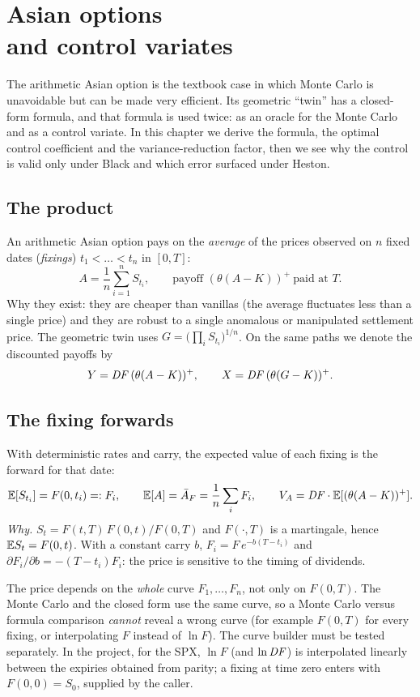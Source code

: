 \chapter[Asian options and control variates]{Asian options\\ and control variates}
\label{cap:asiatiche}

The arithmetic Asian option is the textbook case in which Monte Carlo is unavoidable but can be made very efficient.
Its geometric ``twin'' has a closed-form formula, and that formula is used twice: as an oracle for the Monte Carlo and
as a control variate. In this chapter we derive the formula, the optimal control coefficient and the variance-reduction
factor, then we see why the control is valid only under Black and which error surfaced under Heston.

\section{The product}
An arithmetic Asian option pays on the \emph{average} of the prices observed on $n$ fixed dates (\emph{fixings})
$t_1<\dots<t_n$ in $[0,T]$:
\begin{equation}
A=\frac1n\sum_{i=1}^nS_{t_i},\qquad\text{payoff }(\theta(A-K))^+\ \text{paid at }T .
\end{equation}
Why they exist: they are cheaper than vanillas (the average fluctuates less than a single price) and they are robust
to a single anomalous or manipulated settlement price. The geometric twin uses $G=\big(\prod_iS_{t_i}\big)^{1/n}$. On
the same paths we denote the discounted payoffs by
\[
Y=\mathit{DF}\,(\theta(A-K))^+,\qquad X=\mathit{DF}\,(\theta(G-K))^+.
\]

\section{The fixing forwards}
With deterministic rates and carry, the expected value of each fixing is the forward for that date:
\begin{equation}\label{eq:forward-fixing}
\mathbb{E}[S_{t_i}]=F(0,t_i)=:F_i,\qquad\mathbb{E}[A]=\bar A_F=\frac1n\sum_iF_i,\qquad V_A=\mathit{DF}\cdot\mathbb{E}[(\theta(A-K))^+].
\end{equation}
\emph{Why.} $S_t=F(t,T)\,F(0,t)/F(0,T)$ and $F(\cdot,T)$ is a martingale, hence $\mathbb{E} S_t=F(0,t)$. With a constant
carry $b$, $F_i=F\,e^{-b(T-t_i)}$ and $\partial F_i/\partial b=-(T-t_i)F_i$: the price is sensitive to the timing of
dividends.
\begin{attenzione}
The price depends on the \emph{whole} curve $F_1,\dots,F_n$, not only on $F(0,T)$. The Monte Carlo and the closed
form use the same curve, so a Monte Carlo versus formula comparison \emph{cannot} reveal a wrong curve (for example
$F(0,T)$ for every fixing, or interpolating $F$ instead of $\ln F$). The curve builder must be tested separately. In
the project, for the SPX, $\ln F$ (and $\ln\mathit{DF}$) is interpolated linearly between the expiries obtained from parity;
a fixing at time zero enters with $F(0,0)=S_0$, supplied by the caller.
\end{attenzione}

